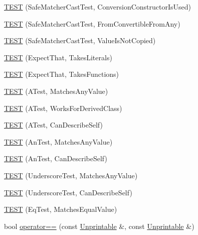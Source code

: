 \begin{DoxyCompactItemize}
\item 
\hyperlink{namespacetesting_1_1gmock__matchers__test_aa608f074e26876d41333cd265c4ca008}{T\+E\+ST} (Safe\+Matcher\+Cast\+Test, Conversion\+Constructor\+Is\+Used)
\item 
\hyperlink{namespacetesting_1_1gmock__matchers__test_a0490279eed67f8fa45f83c4951e1d8a1}{T\+E\+ST} (Safe\+Matcher\+Cast\+Test, From\+Convertible\+From\+Any)
\item 
\hyperlink{namespacetesting_1_1gmock__matchers__test_ac82f8355af7a1e6ba3b67ba8423a1d73}{T\+E\+ST} (Safe\+Matcher\+Cast\+Test, Value\+Is\+Not\+Copied)
\item 
\hyperlink{namespacetesting_1_1gmock__matchers__test_a7672c72f955b937542acd87d18dd7ea6}{T\+E\+ST} (Expect\+That, Takes\+Literals)
\item 
\hyperlink{namespacetesting_1_1gmock__matchers__test_aafaf5273bd3d8ba273a5dd243d3a52ba}{T\+E\+ST} (Expect\+That, Takes\+Functions)
\item 
\hyperlink{namespacetesting_1_1gmock__matchers__test_af15da53cdc65283b8ca688a03801fd12}{T\+E\+ST} (A\+Test, Matches\+Any\+Value)
\item 
\hyperlink{namespacetesting_1_1gmock__matchers__test_a2b2dfb85d18883b07f7d13d21abee2fc}{T\+E\+ST} (A\+Test, Works\+For\+Derived\+Class)
\item 
\hyperlink{namespacetesting_1_1gmock__matchers__test_a24432bc861bee430fb8ac1a4e5463ecf}{T\+E\+ST} (A\+Test, Can\+Describe\+Self)
\item 
\hyperlink{namespacetesting_1_1gmock__matchers__test_a15bf6771986d1e9f675f29861f7551c1}{T\+E\+ST} (An\+Test, Matches\+Any\+Value)
\item 
\hyperlink{namespacetesting_1_1gmock__matchers__test_ac3b18688ca5b5cf2d6137ce3e7397691}{T\+E\+ST} (An\+Test, Can\+Describe\+Self)
\item 
\hyperlink{namespacetesting_1_1gmock__matchers__test_a3fc77fa5ca709ef70963026fd7114552}{T\+E\+ST} (Underscore\+Test, Matches\+Any\+Value)
\item 
\hyperlink{namespacetesting_1_1gmock__matchers__test_a25ae831c15c9ca918ed847ba147ac572}{T\+E\+ST} (Underscore\+Test, Can\+Describe\+Self)
\item 
\hyperlink{namespacetesting_1_1gmock__matchers__test_a2ac5d4c2fae3e7f2e6c6be657a61f86a}{T\+E\+ST} (Eq\+Test, Matches\+Equal\+Value)
\item 
bool \hyperlink{namespacetesting_1_1gmock__matchers__test_a4b9f261a3b98ba0e0bca21b69d593241}{operator==} (const \hyperlink{classtesting_1_1gmock__matchers__test_1_1Unprintable}{Unprintable} \&, const \hyperlink{classtesting_1_1gmock__matchers__test_1_1Unprintable}{Unprintable} \&)

\end{DoxyCompactItemize}

